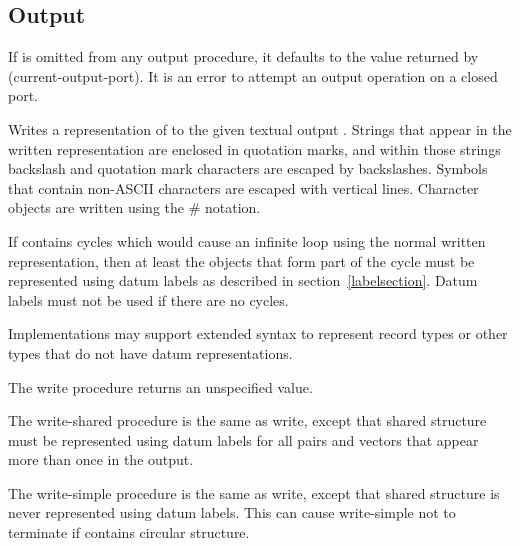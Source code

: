 \subsection{Output}
\label{outputsection}

If  is omitted from any output procedure, it defaults to the
value returned by {\cf (current-output-port)}.
It is an error to attempt an output operation on a closed port.

\noindent \hbox{}
\vspace{-5ex}

\begin{entry}{%
}

Writes a representation of  to the given textual output
.  Strings
that appear in the written representation are enclosed in quotation marks, and
within those strings backslash and quotation mark characters are
escaped by backslashes.  Symbols that contain non-ASCII characters
are escaped with vertical lines.
Character objects are written using the {\cf \#\backwhack} notation.

If  contains cycles which would cause an infinite loop using
the normal written representation, then at least the objects that form
part of the cycle must be represented using datum labels as described
in section~\ref{labelsection}.  Datum labels must not be used if there
are no cycles.

Implementations may support extended syntax to represent record types or
other types that do not have datum representations.

The {\cf write} procedure returns an unspecified value.

\end{entry}

\begin{entry}{%
}

The {\cf write-shared} procedure is the same as {\cf write}, except that
shared structure must be represented using datum labels for all pairs
and vectors that appear more than once in the output.

\end{entry}

\begin{entry}{%
}

The {\cf write-simple} procedure is the same as {\cf write}, except that shared structure is
never represented using datum labels.  This can cause {\cf write-simple} not to
terminate if  contains circular structure.

\end{entry}


